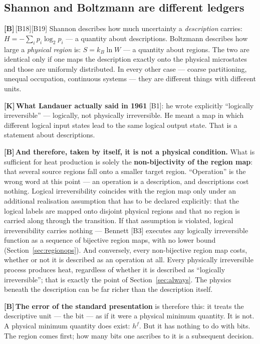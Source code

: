 \documentclass[11pt,a4paper]{article}
\newcommand{\LK}{\textcolor{layK}{\textbf{\footnotesize\textsf{[K]}}}\,}
\newcommand{\LB}{\textcolor{layB}{\textbf{\footnotesize\textsf{[B]}}}\,}
\begin{document}
\subsection{Shannon and Boltzmann are different ledgers}

\LB [B18][B19] Shannon describes how much uncertainty a \emph{description}
carries: $H = -\sum_i p_i \log_2 p_i$ --- a quantity about descriptions. Boltzmann
describes how large a \emph{physical region} is: $S = k_B \ln W$ --- a quantity
about regions. The two are identical only if one maps the description exactly onto
the physical microstates and those are uniformly distributed. In every other case
--- coarse partitioning, unequal occupation, continuous systems --- they are
different things with different units.

\LK \textbf{What Landauer actually said in 1961} [B1]: he wrote explicitly
“logically irreversible” --- logically, not physically irreversible. He meant a
map in which different logical input states lead to the same logical output state.
That is a statement about descriptions.

\LB \textbf{And therefore, taken by itself, it is not a physical condition.} What
is sufficient for heat production is solely the \textbf{non-bijectivity of the
region map}: that several source regions fall onto a smaller target region.
“Operation” is the wrong word at this point --- an operation is a description, and
descriptions cost nothing. Logical irreversibility coincides with the region map
only under an additional realisation assumption that has to be declared
explicitly: that the logical labels are mapped onto disjoint physical regions and
that no region is carried along through the transition. If that assumption is
violated, logical irreversibility carries nothing --- Bennett [B3] executes any
logically irreversible function as a sequence of bijective region maps, with no
lower bound (Section~\ref{sec:regionops}). And conversely, every non-bijective
region map costs, whether or not it is described as an operation at all. Every
physically irreversible process produces heat, regardless of whether it is
described as “logically irreversible”; that is exactly the point of
Section~\ref{sec:always}. The physics beneath the description can be far richer
than the description itself.

\LB \textbf{The error of the standard presentation} is therefore this: it treats
the descriptive unit --- the bit --- as if it were a physical minimum quantity. It
is not. A physical minimum quantity does exist: $h^f$. But it has nothing to do
with bits. The region comes first; how many bits one ascribes to it is a
subsequent decision.
\end{document}
